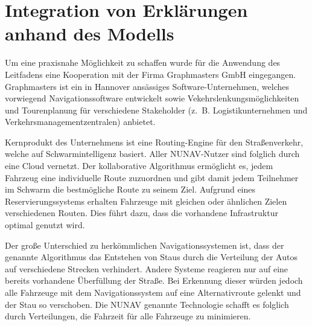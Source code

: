\section{Integration von Erklärungen anhand des Modells}

Um eine praxisnahe Möglichkeit zu schaffen wurde für die Anwendung des Leitfadens eine Kooperation mit der Firma Graphmasters GmbH eingegangen. Graphmasters ist ein in Hannover ansässiges Software-Unternehmen, welches vorwiegend Navigationssoftware entwickelt sowie Vekehrslenkungsmöglichkeiten und Tourenplanung für verschiedene Stakeholder (z.~B. Logistikunternehmen und Verkehrsmanagementzentralen) anbietet. 

Kernprodukt des Unternehmens ist eine Routing-Engine für den Straßenverkehr, welche auf Schwarmintelligenz basiert. Aller NUNAV-Nutzer sind folglich durch eine Cloud vernetzt. Der kollaborative Algorithmus ermöglicht es, jedem Fahrzeug eine individuelle Route zuzuordnen und gibt damit jedem Teilnehmer im Schwarm die bestmögliche Route zu seinem Ziel. Aufgrund eines Reservierungssystems erhalten Fahrzeuge mit gleichen oder ähnlichen Zielen verschiedenen Routen. Dies führt dazu, dass die vorhandene Infrastruktur optimal genutzt wird.

Der große Unterschied zu herkömmlichen Navigationssystemen ist, dass der genannte Algorithmus das Entstehen von Staus durch die Verteilung der Autos auf verschiedene Strecken verhindert. Andere Systeme reagieren nur auf eine bereits vorhandene Überfüllung der Straße. Bei Erkennung dieser würden jedoch alle Fahrzeuge mit dem Navigationssystem auf eine Alternativroute gelenkt und der Stau so verschoben. Die \glqq NUNAV\grqq{} genannte Technologie schaﬀt es folglich durch Verteilungen, die Fahrzeit für alle Fahrzeuge zu minimieren.











